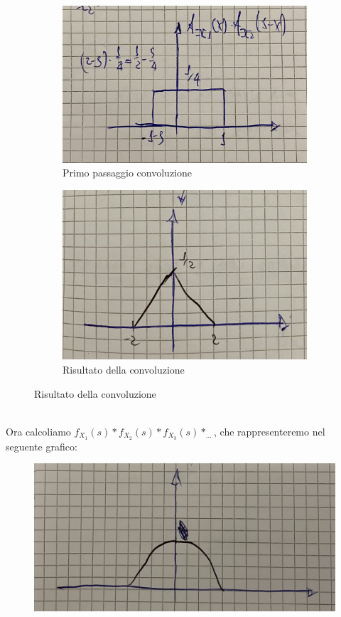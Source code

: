 \documentclass{article}
\begin{document}
\begin{figure}[H]
  \begin{subfigure}{.5\textwidth}
  \centering
    \includegraphics[width=.9\linewidth]{images/85.jpeg}
    \caption{Primo passaggio convoluzione}
  \end{subfigure}
  \begin{subfigure}{.5\textwidth}
  \centering
    \includegraphics[width=.9\linewidth]{images/86.jpeg}
    \caption{Risultato della convoluzione}
  \end{subfigure}
\end{figure} ~\\
Ora calcoliamo $f_{X_1}(s)*f_{X_2}(s)*f_{X_3}(s)* _{\dots}$, che rappresenteremo nel seguente grafico:
\begin{figure}[H]
\centering
\includegraphics[scale=0.13]{images/87.jpeg}
\end{figure} ~\\
\end{document}
